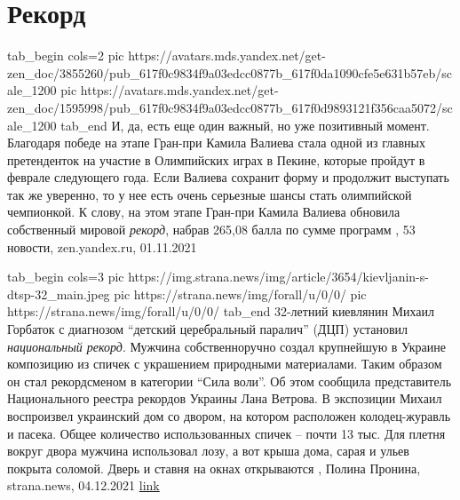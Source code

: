  
 
 
 
 
\chapter{Рекорд}
\label{sec:slova.rekord}

\ifcmt
  tab_begin cols=2
     pic https://avatars.mds.yandex.net/get-zen_doc/3855260/pub_617f0c9834f9a03edcc0877b_617f0da1090cfe5e631b57eb/scale_1200
     pic https://avatars.mds.yandex.net/get-zen_doc/1595998/pub_617f0c9834f9a03edcc0877b_617f0d9893121f356caa5072/scale_1200
  tab_end
\fi
И, да, есть еще один важный, но уже позитивный момент. Благодаря победе на
этапе Гран-при Камила Валиева стала одной из главных претенденток на участие в
Олимпийских играх в Пекине, которые пройдут в феврале следующего года. Если
Валиева сохранит форму и продолжит выступать так же уверенно, то у нее есть
очень серьезные шансы стать олимпийской чемпионкой.  К слову, на этом этапе
Гран-при Камила Валиева обновила собственный мировой \emph{рекорд}, набрав
265,08 балла по сумме программ
, 
53 новости, zen.yandex.ru, 01.11.2021

\ifcmt
  tab_begin cols=3
     pic https://img.strana.news/img/article/3654/kievljanin-s-dtsp-32_main.jpeg
     pic https://strana.news/img/forall/u/0/0/%
		 pic https://strana.news/img/forall/u/0/0/%
  tab_end
\fi
32-летний киевлянин Михаил Горбаток с диагнозом \enquote{детский церебральный паралич}
(ДЦП) установил \emph{национальный рекорд}. Мужчина собственноручно создал крупнейшую
в Украине композицию из спичек с украшением природными материалами. Таким
образом он стал рекордсменом в категории \enquote{Сила воли}.  Об этом сообщила
представитель Национального реестра рекордов Украины Лана Ветрова.  В
экспозиции Михаил воспроизвел украинский дом со двором, на котором расположен
колодец-журавль и пасека.  Общее количество использованных спичек – почти 13
тыс. Для плетня вокруг двора мужчина использовал лозу, а вот крыша дома, сарая
и ульев покрыта соломой. Дверь и ставня на окнах открываются
, 
Полина Пронина, strana.news, 04.12.2021
\href{https://strana.news/news/365432-kievljanin-s-dtsp-ustanovil-rekord-sozdav-krupnejshuju-v-ukraine-ekspozitsiju-iz-spichek.html}{link}
